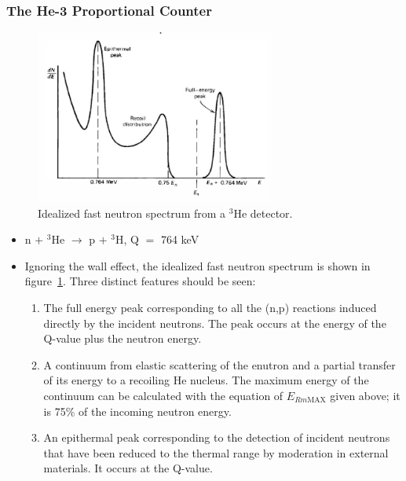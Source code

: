\subsubsection{The He-3 Proportional Counter}
\begin{figure}[ht]
    \centering
    \includegraphics[width=0.7\textwidth]{images/fast_neutrons_3He.png}
    \caption{Idealized fast neutron spectrum from a $^3$He detector.}
    \label{fig:fast_neutrons_3He}
\end{figure}
\begin{itemize}
    \item n $+$ $^3$He $\rightarrow$ p $+$ $^3$H, Q $=$ 764 keV
    \item Ignoring the wall effect, the idealized fast neutron spectrum is shown in figure~\ref{fig:fast_neutrons_3He}. Three distinct features should be seen:
    \begin{enumerate}
        \item The full energy peak corresponding to all the (n,p) reactions induced directly by the incident neutrons. The peak occurs at the energy of the Q-value plus the neutron energy. 
        \item A continuum from elastic scattering of the enutron and a partial transfer of its energy to a recoiling He nucleus. The maximum energy of the continuum can be calculated with the equation of $E_{Rm\text{MAX}}$ given above; it is 75\% of the incoming neutron energy. 
        \item An epithermal peak corresponding to the detection of incident neutrons that have been reduced to the thermal range by moderation in external materials. It occurs at the Q-value. 
    \end{enumerate}
\end{itemize}


